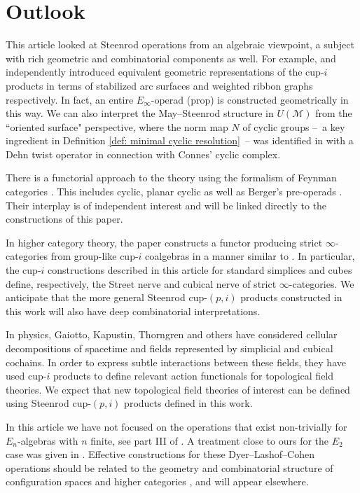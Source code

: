 
\section{Outlook} \label{s:outlook}

This article looked at Steenrod operations from an algebraic viewpoint, a subject with rich geometric and combinatorial components as well.
For example, \cite{Postnikov} and \cite{medina2018prop2} independently introduced equivalent geometric representations of the cup-$i$ products in terms of stabilized arc surfaces \cite{KLP} and weighted ribbon graphs respectively.
In fact, an entire $E_\infty$-operad (prop) is constructed geometrically in this way.
We can also interpret the May--Steenrod structure in $U(\mathcal M)$ from the ``oriented surface" perspective, where the norm map $N$ of cyclic groups --~a key ingredient in Definition \ref{def: minimal cyclic resolution}~-- was identified in \cite{KLP} with a Dehn twist operator in connection with Connes' cyclic complex.

There is a functorial approach to the theory using the formalism of Feynman categories \cite{feynman}.
This includes cyclic, planar cyclic as well as Berger's pre-operads \cite{BergerRecog}.
Their interplay is of independent interest \cite{BergerKaufmann, feyrep} and will be linked directly to the constructions of this paper.

In higher category theory, the paper \cite{medina2020globular} constructs a functor producing strict $\infty$-categories from group-like cup-$i$ coalgebras in a manner similar to \cite{steiner2004omega}.
In particular, the cup-$i$ constructions described in this article for standard simplices and cubes define, respectively, the Street nerve and cubical nerve of strict $\infty$-categories.
We anticipate that the more general Steenrod cup-$(p,i)$ products constructed in this work will also have deep combinatorial interpretations.

In physics, Gaiotto, Kapustin, Thorngren \cite{gaiotto2016spin,bhardwaj2017fermionic,kapustin2017fermionic} and others have considered cellular decompositions of spacetime and fields represented by simplicial and cubical cochains.
In order to express subtle interactions between these fields, they have used cup-$i$ products to define relevant action functionals for topological field theories.
We expect that new topological field theories of interest can be defined using Steenrod cup-$(p,i)$ products defined in this work.

In this article we have not focused on the operations that exist non-trivially for $E_n$-algebras with $n$ finite, see part III of \cite{may76homology}.
A treatment close to ours for the $E_2$ case was given in \cite{tourtchine2006cohen}.
Effective constructions for these Dyer--Lashof--Cohen operations should be related to the geometry and combinatorial structure of configuration spaces \cite{KZhang, sinha2013littledisks, berger2004combinatorial, ayala2014configuration} and higher categories \cite{Bathigher, BalFiedSchwVogt, Rezkhigher}, and will appear elsewhere.

